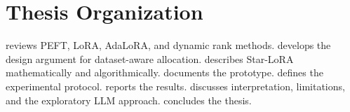 \section{Thesis Organization}

 reviews PEFT, LoRA, AdaLoRA, and dynamic rank methods.
 develops the design argument for dataset-aware allocation.
 describes Star-LoRA mathematically and algorithmically.
 documents the prototype.
 defines the experimental protocol.
 reports the results.
 discusses interpretation, limitations, and the exploratory LLM approach.
 concludes the thesis.
